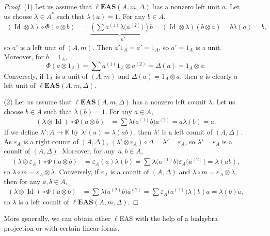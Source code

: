 \documentclass[10pt,a4paper]{amsart}
\numberwithin{equation}{section}
\newcommand{\leas}{\ell\mathbf{EAS}}
\begin{document}
\begin{proof}
(1) Let us assume that $\leas(A,m,\Delta)$ has a nonzero left unit $a$. Let us choose $\lambda \in A^*$ such that $\lambda(a)=1$. For any $b\in A$,
\begin{align*}
(\operatorname{Id} \otimes \lambda)\circ \Phi(a\otimes b)&=\underbrace{\left(\sum a^{(1)}\lambda\bigl(a^{(2)}\bigr)\right)}_{=a'} b=(\operatorname{Id} \otimes \lambda)(b\otimes a)=b\lambda(a)=b,
\end{align*}
so $a'$ is a left unit of $(A,m)$. Then $a'1_A=a'=1_A$, so $a'=1_A$ is a unit. Moreover, for $b=1_A$,
\[\Phi(a\otimes 1_A)=\sum a^{(1)}1_A\otimes a^{(2)}=\Delta(a)=1_A\otimes a.\]
Conversely, if $1_A$ is a unit of $(A,m)$ and $\Delta(a)=1_A\otimes a$, then $a$ is clearly a left unit of $\leas(A,m,\Delta)$.

(2) Let us assume that $\leas(A,m,\Delta)$ has a nonzero left counit $\lambda$. Let us choose $b\in A$ such that $\lambda(b)=1$. For any $a\in A$,
\begin{align*}
(\lambda \otimes \operatorname{Id})\circ \Phi(a\otimes b)&=\sum \lambda\bigl(a^{(1)}b\bigr)a^{(2)}=a\lambda(b)=a.
\end{align*}
If we define $\lambda'\colon A\longrightarrow \mathbb{K}$ by $\lambda'(a)=\lambda(ab)$, then $\lambda'$ is a left counit of $(A,\Delta)$. As $\varepsilon_A$ is a right counit of $(A,\Delta)$,
$(\lambda'\otimes \varepsilon_A)\circ \Delta=\lambda'=\varepsilon_A$,
so $\lambda'=\varepsilon_A$ is a counit of $(A,\Delta)$. Moreover, for any~${a,b\in A}$,
\begin{align*}
(\lambda \otimes \varepsilon_A)\circ \Phi(a\otimes b)&=\varepsilon_A(a)\lambda(b)=\sum \lambda\bigl(a^{(1)}b\bigr)\varepsilon_A\bigl(a^{(2)}\bigr)=\lambda(ab),
\end{align*}
so $\lambda \circ m=\varepsilon_A\otimes \lambda$. Conversely, if $\varepsilon_A$ is a counit of $(A,\Delta)$ and $\lambda \circ m=\varepsilon_A\otimes \lambda$, then for any $a,b\in A$,
\begin{align*}
(\lambda \otimes \operatorname{Id})\circ \Phi(a\otimes b)&=\sum \lambda\bigl(a^{(2)}b\bigr)a^{(2)}=\sum \varepsilon_A\bigl(a^{(1)}\bigr)\lambda(b)a=\lambda(b)a,
\end{align*}
so $\lambda$ is a left counit of $\leas(A,m,\Delta)$. \end{proof}

More generally, we can obtain other $\ell$EAS with the help of a bialgebra projection or with certain linear forms.
\end{document}
